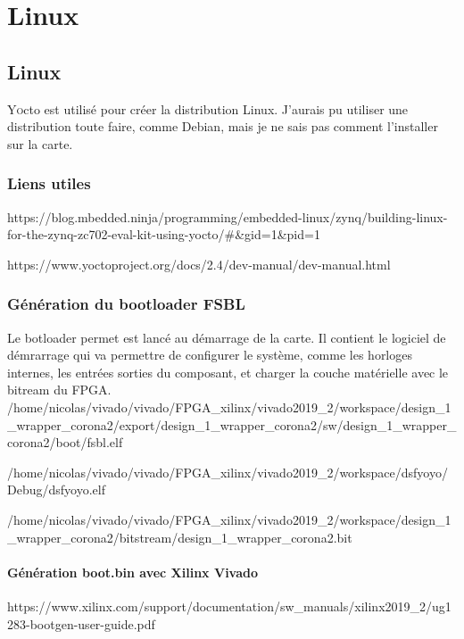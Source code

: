 \newpage
\chapter{Linux}
\section{Linux}

\lettrine[lines=1]{Y}octo est utilisé pour créer la distribution Linux. J'aurais pu utiliser une distribution toute faire, comme Debian, mais je ne sais pas comment l'installer sur la carte. 

\subsection{Liens utiles}

https://blog.mbedded.ninja/programming/embedded-linux/zynq/building-linux-for-the-zynq-zc702-eval-kit-using-yocto/#&gid=1&pid=1

https://www.yoctoproject.org/docs/2.4/dev-manual/dev-manual.html

\subsection{Génération du bootloader FSBL}
Le botloader permet est lancé au démarrage de la carte. Il contient le logiciel de démrarrage qui va permettre de configurer le système, comme les horloges internes, les entrées sorties du composant, et charger la couche matérielle avec le bitream du FPGA.
\\
/home/nicolas/vivado/vivado/FPGA_xilinx/vivado2019_2/workspace/design_1_wrapper_corona2/export/design_1_wrapper_corona2/sw/design_1_wrapper_corona2/boot/fsbl.elf

/home/nicolas/vivado/vivado/FPGA_xilinx/vivado2019_2/workspace/dsfyoyo/Debug/dsfyoyo.elf

/home/nicolas/vivado/vivado/FPGA_xilinx/vivado2019_2/workspace/design_1_wrapper_corona2/bitstream/design_1_wrapper_corona2.bit


\subsubsection{Génération boot.bin avec Xilinx Vivado}

https://www.xilinx.com/support/documentation/sw_manuals/xilinx2019_2/ug1283-bootgen-user-guide.pdf

